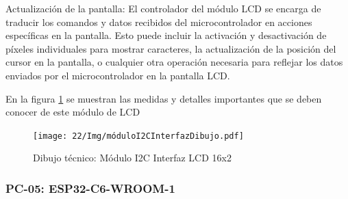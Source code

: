     Actualización de la pantalla: El controlador del módulo LCD se encarga de traducir los comandos y datos recibidos del microcontrolador en acciones específicas en la pantalla. Esto puede incluir la activación y desactivación de píxeles individuales para mostrar caracteres, la actualización de la posición del cursor en la pantalla, o cualquier otra operación necesaria para reflejar los datos enviados por el microcontrolador en la pantalla LCD.
    
    En la figura \ref{fig:modulo} se muestran las medidas y detalles importantes que se deben conocer de este módulo de LCD
    \begin{figure}[H]
        \centering
        \texttt{[image: 22/Img/móduloI2CInterfazDibujo.pdf]}
        \caption{Dibujo técnico: Módulo I2C Interfaz LCD 16x2}
        \label{fig:modulo}
    \end{figure}
    
    
    \subsubsection{PC-05: ESP32-C6-WROOM-1 }
    
